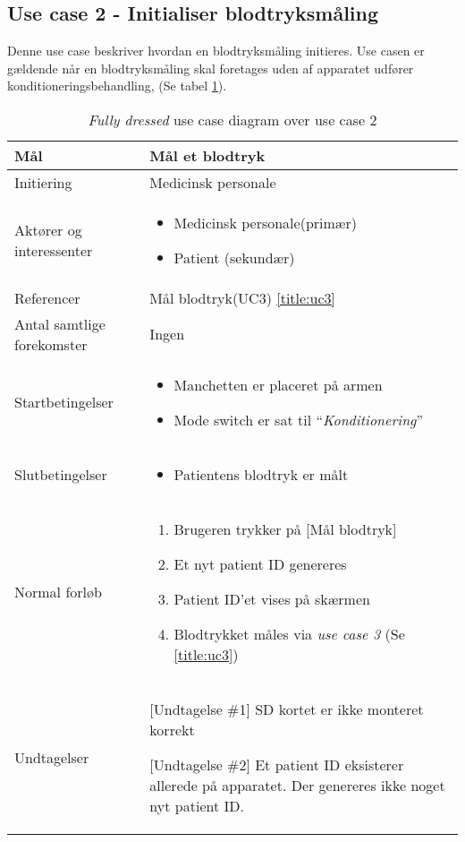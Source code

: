 	\subsection{Use case 2 - Initialiser blodtryksmåling }
	Denne use case beskriver hvordan en blodtryksmåling initieres. Use casen er gældende når en blodtryksmåling skal foretages uden af apparatet udfører konditioneringsbehandling, (Se tabel \ref{tab:uc2}).
	\begin{table}[H]
		\begin{center}
			\begin{tabular}{ | p{} | p{}| } 
				\hline
				Mål& Mål et blodtryk\\ 
				\hline
				Initiering &  Medicinsk personale\\
				\hline
				Aktører og interessenter & 
				\begin{itemize}
					\item Medicinsk personale(primær)
					\item Patient (sekundær)
				\end{itemize} \\ 
				\hline
				Referencer & Mål blodtryk(UC3) \ref{title:uc3} \\ 
				\hline
				Antal samtlige forekomster & Ingen\\ 
				\hline	
				Startbetingelser & 
				\begin{itemize}
					\item Manchetten er placeret på armen
					\item Mode switch er sat til “\textit{Konditionering}”
				\end{itemize} \\ 
				\hline
				Slutbetingelser & 
				\begin{itemize}
					\item Patientens blodtryk er målt
				\end{itemize} \\ 
				\hline
				Normal forløb & \begin{enumerate}
					\setlength\itemsep{0cm} %
					\item Brugeren trykker på [Mål blodtryk]
					\subitem [Undtagelse \#1]
					\item Et nyt patient ID genereres
					\subitem [Undtagelse \#2] 
					\item Patient ID’et vises på skærmen
					\item Blodtrykket måles via \textit{use case 3} (Se \ref{title:uc3})
					
				\end{enumerate} \\ 
				\hline
				Undtagelser & [Undtagelse \#1] SD kortet er ikke monteret korrekt
				
				[Undtagelse \#2] Et patient ID eksisterer allerede på apparatet. Der genereres ikke noget nyt patient ID. \\ 
				\hline
				
			\end{tabular}
		\end{center}
		\caption{\textit{Fully dressed} use case diagram over use case 2} \label{tab:uc2}
			\end{table}
		\newpage